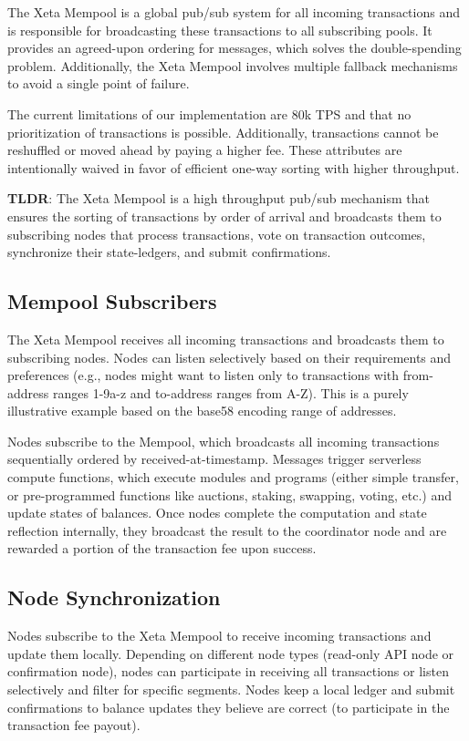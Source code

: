 \documentclass{article}
\begin{document}
The Xeta Mempool is a global pub/sub system for all incoming transactions and is responsible for broadcasting these transactions to all subscribing pools. It provides an agreed-upon ordering for messages, which solves the double-spending problem. Additionally, the Xeta Mempool involves multiple fallback mechanisms to avoid a single point of failure.
\bigskip

The current limitations of our implementation are 80k TPS and that no prioritization of transactions is possible. Additionally, transactions cannot be reshuffled or moved ahead by paying a higher fee. These attributes are intentionally waived in favor of efficient one-way sorting with higher throughput.
\bigskip

\textbf{TLDR}: The Xeta Mempool is a high throughput pub/sub mechanism that ensures the sorting of transactions by order of arrival and broadcasts them to subscribing nodes that process transactions, vote on transaction outcomes, synchronize their state-ledgers, and submit confirmations.

\subsection{Mempool Subscribers}
The Xeta Mempool receives all incoming transactions and broadcasts them to subscribing nodes. Nodes can listen selectively based on their requirements and preferences (e.g., nodes might want to listen only to transactions with from-address ranges 1-9a-z and to-address ranges from A-Z). This is a purely illustrative example based on the base58 encoding range of addresses.
\bigskip

Nodes subscribe to the Mempool, which broadcasts all incoming transactions sequentially ordered by received-at-timestamp. Messages trigger serverless compute functions, which execute modules and programs (either simple transfer, or pre-programmed functions like auctions, staking, swapping, voting, etc.) and update states of balances. Once nodes complete the computation and state reflection internally, they broadcast the result to the coordinator node and are rewarded a portion of the transaction fee upon success.

\subsection{Node Synchronization}
Nodes subscribe to the Xeta Mempool to receive incoming transactions and update them locally. Depending on different node types (read-only API node or confirmation node), nodes can participate in receiving all transactions or listen selectively and filter for specific segments. Nodes keep a local ledger and submit confirmations to balance updates they believe are correct (to participate in the transaction fee payout).
\bigskip
\end{document}
